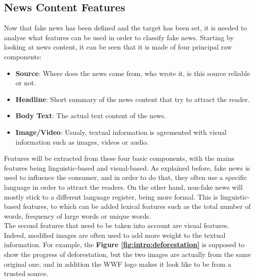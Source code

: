 \subsection{News Content Features}
Now that fake news has been defined and the target has been set, it is needed to analyse what features can be used in order to classify fake news. Starting by looking at news content, it can be seen that it is made of four principal raw components: 
\begin{itemize}
 \item \textbf{Source}: Where does the news come from, who wrote it, is this source reliable or not.
 \item \textbf{Headline}: Short summary of the news content that try to attract the reader.
 \item \textbf{Body Text}: The actual text content of the news.
 \item \textbf{Image/Video}: Usualy, textual information is agremented with visual information such as images, videos or audio.  
\end{itemize}

Features will be extracted from these four basic components, with the mains features being linguistic-based and visual-based. 
As explained before, fake news is used to influence the consumer, and in order to do that, they often use a specific language in order to attract the readers. On the other hand, non-fake news will mostly stick to a different language register, being more formal. This is linguistic-based features, to which can be added lexical features such as the total number of words, frequency of large words or unique words. \\

The second features that need to be taken into account are visual features. Indeed, modified images are often used to add more weight to the textual information. For example, the \textbf{Figure \ref{fig:intro:deforestation}} is supposed to show the progress of deforestation, but the two images are actually from the same original one, and in addition the WWF logo makes it look like to be from a trusted source. 

